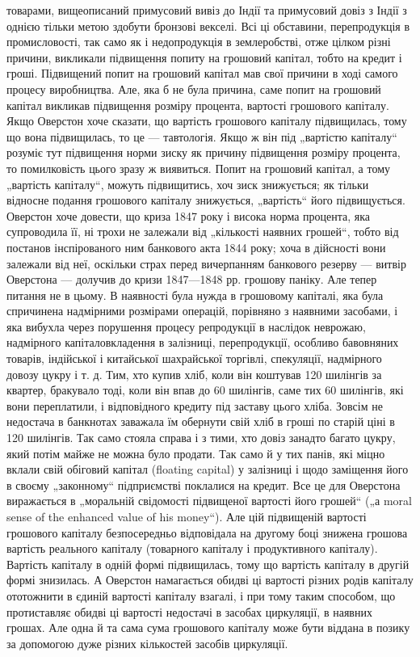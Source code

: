\parcont{}  %
товарами, вищеописаний примусовий вивіз до Індії та примусовий
довіз з Індії з однією тільки метою здобути бронзові векселі.
Всі ці обставини, перепродукція в промисловості, так само як
і недопродукція в землеробстві, отже цілком різні причини, викликали підвищення попиту на грошовий
капітал, тобто на кредит і гроші. Підвищений попит на грошовий капітал мав свої
причини в ході самого процесу виробництва. Але, яка б не була
причина, саме попит на грошовий капітал викликав підвищення
розміру процента, вартості грошового капіталу. Якщо Оверстон хоче сказати, що вартість грошового
капіталу підвищилась, тому що вона підвищилась, то це — тавтологія. Якщо ж
він під „вартістю капіталу“ розуміє тут підвищення норми зиску
як причину підвищення розміру процента, то помилковість цього
зразу ж виявиться. Попит на грошовий капітал, а тому „вартість капіталу“, можуть підвищитись, хоч
зиск знижується; як
тільки відносне подання грошового капіталу знижується, „вартість“ його підвищується. Оверстон хоче
довести, що криза 1847 року і висока норма процента, яка супроводила її, ні трохи
не залежали від „кількості наявних грошей“, тобто від постанов інспірованого ним банкового акта 1844
року; хоча в дійсності вони залежали від неї, оскільки страх перед вичерпанням
банкового резерву — витвір Оверстона — долучив до кризи 1847—1848 рр. грошову паніку. Але тепер
питання не в цьому.
В наявності була нужда в грошовому капіталі, яка була спричинена надмірними розмірами операцій,
порівняно з наявними засобами, і яка вибухла через порушення процесу репродукції в наслідок
неврожаю, надмірного капіталовкладення в залізниці, перепродукції, особливо бавовняних товарів,
індійської і китайської
шахрайської торгівлі, спекуляції, надмірного довозу цукру і т. д.
Тим, хто купив хліб, коли він коштував 120 шилінгів за квартер, бракувало тоді, коли він впав до 60
шилінгів, саме тих
60 шилінгів, які вони переплатили, і відповідного кредиту під
заставу цього хліба. Зовсім не недостача в банкнотах заважала
їм обернути свій хліб в гроші по старій ціні в 120 шилінгів.
Так само стояла справа і з тими, хто довіз занадто багато
цукру, який потім майже не можна було продати. Так само й
у тих панів, які міцно вклали свій обіговий капітал (floating capital)
у залізниці і щодо заміщення його в своєму „законному“ підприємстві поклалися на кредит. Все це для
Оверстона виражається в „моральній свідомості підвищеної вартості його грошей“ („а moral sense of
the enhanced value of his money“). Але цій
підвищеній вартості грошового капіталу безпосередньо відповідала на другому боці знижена грошова
вартість реального капіталу
(товарного капіталу і продуктивного капіталу). Вартість капіталу
в одній формі підвищилась, тому що вартість капіталу в другій
формі знизилась. А Оверстон намагається обидві ці вартості різних
родів капіталу ототожнити в єдиній вартості капіталу взагалі, і
при тому таким способом, що протиставляє обидві ці вартості недостачі
в засобах циркуляції, в наявних грошах. Але одна й та сама
сума грошового капіталу може бути віддана в позику за допомогою дуже різних кількостей засобів
циркуляції.

